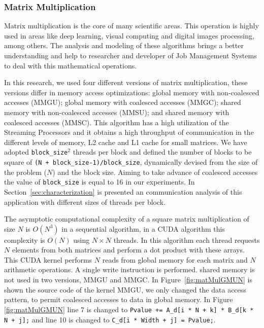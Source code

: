 \subsubsection{Matrix Multiplication}
Matrix multiplication is the core of many scientific areas. This operation is highly used in areas like deep learning, visual computing and digital images processing, among others. The analysis and modeling of these algorithms brings a better understanding and help to researcher and developer of Job Management Systems to deal with this mathematical operations.

In this research, we used four different versions of matrix multiplication, these versions differ in memory access optimizations: global memory with non-coalesced accesses (MMGU); global memory with coalesced accesses (MMGC); shared memory with non-coalesced accesses (MMSU); and shared memory with coalesced accesses (MMSC). This algorithm has a high utilization of the Streaming Processors and it obtains a high throughput of communication in the different levels of memory, L2 cache and L1 cache for small matrices. We have adopted \texttt{block\_size}$^2$ threads per block and defined the number of blocks to be square of \texttt{(N + block\_size-1)/block\_size}, dynamically devised from the size of the problem ($N$) and the block size. Aiming to take advance of coalesced accesses the value of \texttt{block\_size} is equal to 16 in our experiments. In Section~\ref{sec:characterization} is presented an communication analysis of this application with different sizes of threads per block.

The asymptotic computational complexity of a square matrix multiplication of size $N$ is $O(N^3)$ in a sequential algorithm, in a CUDA algorithm this complexity is $O(N)$ using $N\times{}N$ threads. In this algorithm each thread requests $N$ elements from both matrices and perform a dot product with these arrays. This CUDA kernel performs $N$ reads from global memory for each matrix and $N$ arithmetic operations. A single write instruction is performed. shared memory is not used in two versions, MMGU and MMGC. In Figure~\ref{fig:matMulGMUN} is shown the source code of the kernel MMGU, we only changed the data access pattern, to permit coalesced accesses to data in global memory. In Figure \ref{fig:matMulGMUN} line 7 is changed to \texttt{Pvalue += A\_d[i * N + k] * B\_d[k * N + j];} and line 10 is changed to \texttt{C\_d[i * Width + j] = Pvalue;}.


